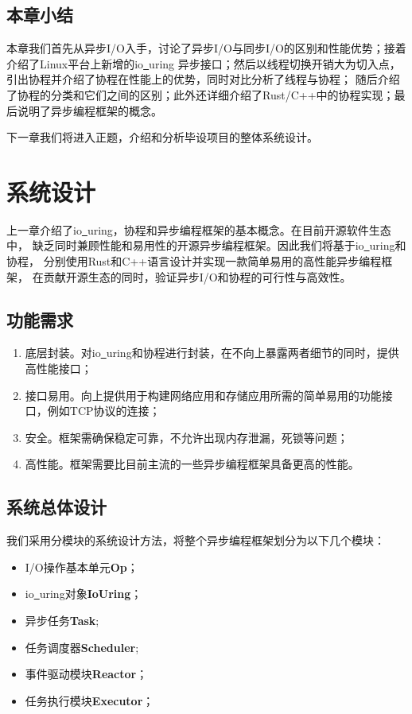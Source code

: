 \documentclass[supercite]{HustGraduPaper}
\theoremstyle{definition}
\begin{document}
\subsection{本章小结}

本章我们首先从异步I/O入手，讨论了异步I/O与同步I/O的区别和性能优势；接着介绍了Linux平台上新增的io\underline{~}uring
异步接口；然后以线程切换开销大为切入点，引出协程并介绍了协程在性能上的优势，同时对比分析了线程与协程；
随后介绍了协程的分类和它们之间的区别；此外还详细介绍了Rust/C++中的协程实现；最后说明了异步编程框架的概念。\par

下一章我们将进入正题，介绍和分析毕设项目的整体系统设计。\par

\section{系统设计}
上一章介绍了io\underline{~}uring，协程和异步编程框架的基本概念。在目前开源软件生态中，
缺乏同时兼顾性能和易用性的开源异步编程框架。因此我们将基于io\underline{~}uring和协程，
分别使用Rust和C++语言设计并实现一款简单易用的高性能异步编程框架，
在贡献开源生态的同时，验证异步I/O和协程的可行性与高效性。\par

\subsection{功能需求}

\begin{enumerate}
  \item 底层封装。对io\underline{~}uring和协程进行封装，在不向上暴露两者细节的同时，提供高性能接口；
  \item 接口易用。向上提供用于构建网络应用和存储应用所需的简单易用的功能接口，例如TCP协议的连接；
  \item 安全。框架需确保稳定可靠，不允许出现内存泄漏，死锁等问题；
  \item 高性能。框架需要比目前主流的一些异步编程框架具备更高的性能。
\end{enumerate}

\subsection{系统总体设计}

我们采用分模块的系统设计方法，将整个异步编程框架划分为以下几个模块：

\begin{itemize}
  \item I/O操作基本单元\textbf{Op}；
  \item io\underline{~}uring对象\textbf{IoUring}；
  \item 异步任务\textbf{Task};
  \item 任务调度器\textbf{Scheduler};
  \item 事件驱动模块\textbf{Reactor}；
  \item 任务执行模块\textbf{Executor}；
\end{itemize}
\end{document}

